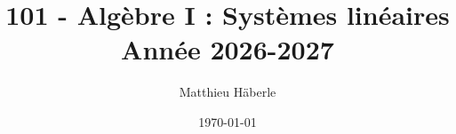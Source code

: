 \documentclass[a4paper, 12pt]{report}
\title{
	{\Huge 101 - Algèbre I : Systèmes linéaires \\ }
	{\huge Année 2026-2027}
}
\author{\Large{Matthieu Häberle}}
\date{\today}
\begin{document}
\maketitle
\newpage
\twocolstableofcontents
\pagebreak










%
%


\end{document}
